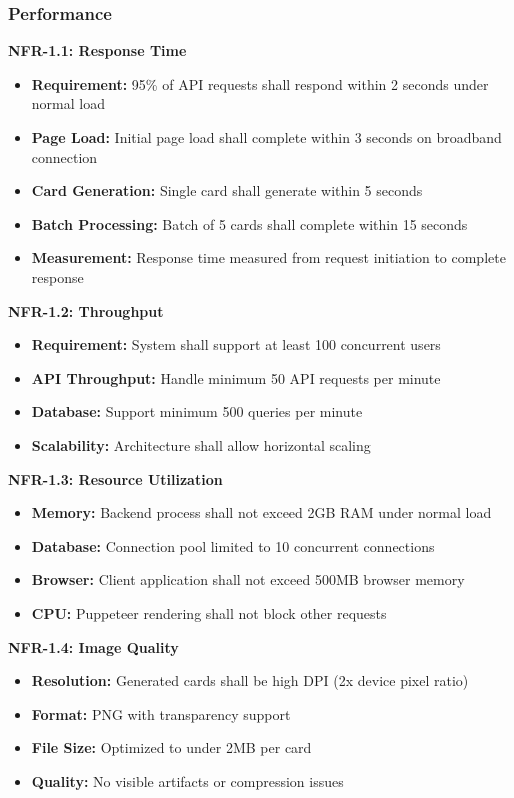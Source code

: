 \documentclass[12pt,a4paper]{article}
\begin{document}
\subsubsection{Performance}

\textbf{NFR-1.1: Response Time}
\begin{itemize}
    \item \textbf{Requirement:} 95\% of API requests shall respond within 2 seconds under normal load
    \item \textbf{Page Load:} Initial page load shall complete within 3 seconds on broadband connection
    \item \textbf{Card Generation:} Single card shall generate within 5 seconds
    \item \textbf{Batch Processing:} Batch of 5 cards shall complete within 15 seconds
    \item \textbf{Measurement:} Response time measured from request initiation to complete response
\end{itemize}

\textbf{NFR-1.2: Throughput}
\begin{itemize}
    \item \textbf{Requirement:} System shall support at least 100 concurrent users
    \item \textbf{API Throughput:} Handle minimum 50 API requests per minute
    \item \textbf{Database:} Support minimum 500 queries per minute
    \item \textbf{Scalability:} Architecture shall allow horizontal scaling
\end{itemize}

\textbf{NFR-1.3: Resource Utilization}
\begin{itemize}
    \item \textbf{Memory:} Backend process shall not exceed 2GB RAM under normal load
    \item \textbf{Database:} Connection pool limited to 10 concurrent connections
    \item \textbf{Browser:} Client application shall not exceed 500MB browser memory
    \item \textbf{CPU:} Puppeteer rendering shall not block other requests
\end{itemize}

\textbf{NFR-1.4: Image Quality}
\begin{itemize}
    \item \textbf{Resolution:} Generated cards shall be high DPI (2x device pixel ratio)
    \item \textbf{Format:} PNG with transparency support
    \item \textbf{File Size:} Optimized to under 2MB per card
    \item \textbf{Quality:} No visible artifacts or compression issues
\end{itemize}
\end{document}
